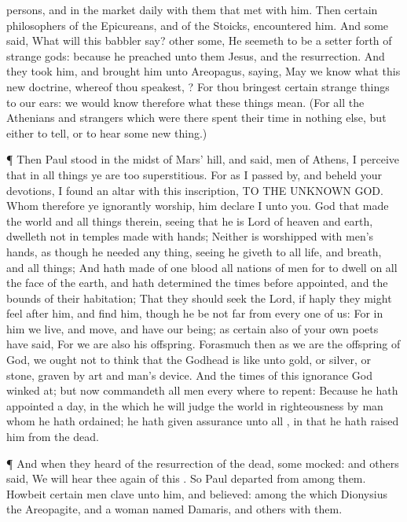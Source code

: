 {persons,
and
in the
market
daily
with them
that met with
him.
Then
certain
philosophers of the
Epicureans,
and of the
Stoicks,
encountered
him.
And
some
said,
What
will
this
babbler
say? other
some, He
seemeth to
be a setter
forth of
strange
gods:
because he
preached unto
them
Jesus,
and the
resurrection.
And they
took
him, and brought
him
unto
Areopagus,
saying,
May we
know
what
this
new
doctrine,
whereof
thou
speakest,
{}?
For thou
bringest
certain
strange things
to
our
ears: we
would
know
therefore
what these
things
mean.
(For
all the
Athenians
and
strangers
which were
there spent their
time
in
nothing
else, but
either to
tell,
or to
hear
some new
thing.)
\par }{\PP {}¶
Then
Paul
stood
in the
midst of
Mars’
hill, and
said,
{}
men of
Athens, I
perceive that
in all
things
ye
are too
superstitious.
For as I passed
by,
and
beheld
your
devotions, I
found an
altar
with
this
inscription, TO THE
UNKNOWN
GOD.
Whom
therefore ye
ignorantly
worship,
him
declare
I unto
you.
God that
made the
world
and all
things
therein, seeing that
he
is
Lord of
heaven
and
earth,
dwelleth
not
in
temples made with
hands;
Neither is
worshipped
with
men’s
hands, as though he
needed any
thing, seeing
he
giveth to
all
life,
and
breath,
and all
things;
And hath
made
of
one
blood
all
nations of
men for to
dwell
on
all the
face of the
earth, and hath
determined the
times before
appointed,
and the
bounds of
their
habitation;
That they should
seek the
Lord,
if
haply they might feel
after
him,
and
find
him,
though he
be
not
far
from
every
one of
us:
For
in
him we
live,
and
move,
and have our
being;
as
certain
also
of your
own
poets have
said,
For we
are
also his
offspring.
Forasmuch
then as we
are the
offspring of
God, we
ought
not to think
that the
Godhead
is like
unto
gold,
or
silver,
or
stone,
graven by
art
and
man’s
device.
And the
times of this
ignorance
God winked
at;
but
now
commandeth
all
men every
where to
repent:
Because he hath
appointed a
day,
in the
which he
will
judge the
world
in
righteousness
by
{}
man
whom he hath
ordained;
{} he hath
given
assurance unto
all
{}, in that he hath
raised
him
from the
dead.
\par }{\PP {}¶
And when they
heard of the
resurrection of the
dead,
some
mocked:
and
others
said, We will
hear
thee
again
of
this
{}.
So
Paul
departed
from
among
them.
Howbeit
certain
men
clave unto
him, and
believed:
among the
which
{}
Dionysius the
Areopagite,
and a
woman
named
Damaris,
and
others
with
them.

}
